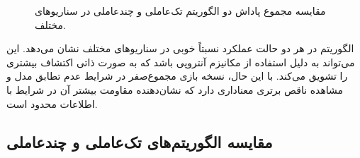 \begin{figure}[H]
	\caption{مقایسه مجموع پاداش دو الگوریتم تک‌عاملی و چندعاملی  در سناریوهای مختلف. 
}
	\label{fig:sac_robustness_violin}
\end{figure}

الگوریتم  در هر دو حالت عملکرد نسبتاً خوبی در سناریوهای مختلف نشان می‌دهد. این می‌تواند به دلیل استفاده از مکانیزم آنتروپی باشد که به صورت ذاتی اکتشاف بیشتری را تشویق می‌کند. با این حال، نسخه بازی مجموع‌صفر در شرایط عدم تطابق مدل و مشاهده ناقص برتری معناداری دارد که نشان‌دهنده مقاومت بیشتر آن در شرایط با اطلاعات محدود است.

\subsection{مقایسه الگوریتم‌های تک‌عاملی و چندعاملی }

